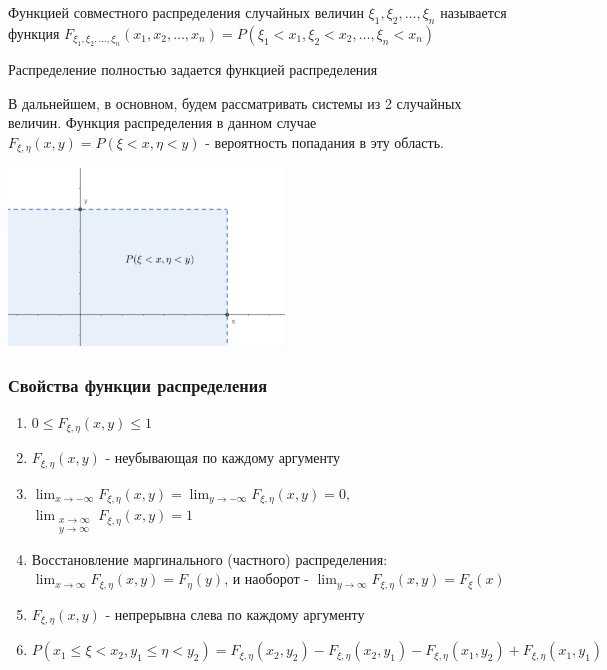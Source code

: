 \documentclass[12pt]{article}
\begin{document}
        
    \Def Функцией совместного распределения случайных величин $\xi_1, \xi_2, \dots, \xi_n$ называется функция 
    $F_{\xi_1, \xi_2, \dots, \xi_n}(x_1, x_2, \dots, x_n) = P(\xi_1 < x_1, \xi_2 < x_2, \dots, \xi_n < x_n)$

    \Notas Распределение полностью задается функцией распределения

    \Nota В дальнейшем, в основном, будем рассматривать системы из 2 случайных величин. Функция распределения в данном случае $F_{\xi, \eta}(x, y) = P(\xi < x, \eta < y)$ - вероятность попадания в эту область.

    \begin{center}
        \includegraphics[width=0.55\textwidth]{probtheory/images/probtheory_2024_11_19_1}
    \end{center}


    \subsubsection{Свойства функции распределения}

    \begin{enumerate}
        \item $0 \leq F_{\xi, \eta}(x, y) \leq 1$
        \item $F_{\xi, \eta}(x, y)$ - неубывающая по каждому аргументу
        \item $\lim_{x \to -\infty} F_{\xi, \eta}(x, y) = \lim_{y \to -\infty} F_{\xi, \eta}(x, y) = 0, $
        $\lim_{\substack{x \to \infty \\ y \to \infty}} F_{\xi, \eta}(x, y) = 1$

        \item Восстановление маргинального (частного) распределения: 
        $\lim_{x \to \infty} F_{\xi, \eta}(x, y) = F_\eta(y)$, и наоборот - $\lim_{y \to \infty} F_{\xi, \eta}(x, y) = F_\xi(x)$

        \item $F_{\xi, \eta}(x, y)$ - непрерывна слева по каждому аргументу

        \item $P(x_1 \leq \xi < x_2, y_1 \leq \eta < y_2) = F_{\xi, \eta}(x_2, y_2) - F_{\xi, \eta}(x_2, y_1) - F_{\xi, \eta}(x_1, y_2) + F_{\xi, \eta}(x_1, y_1)$
    \end{enumerate}
\end{document}
